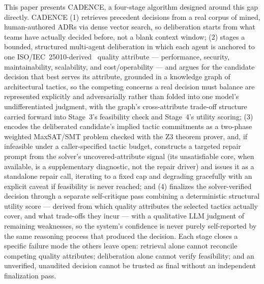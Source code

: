 \documentclass[lettersize,journal]{IEEEtran}
\begin{document}
This paper presents CADENCE, a four-stage algorithm designed around this gap directly. CADENCE (1) retrieves precedent decisions from a real corpus of mined, human-authored ADRs via dense vector search, so deliberation starts from what teams have actually decided before, not a blank context window; (2) stages a bounded, structured multi-agent deliberation in which each agent is anchored to one ISO/IEC~25010-derived~\cite{iso25010} quality attribute --- performance, security, maintainability, scalability, and cost/operability --- and argues for the candidate decision that best serves its attribute, grounded in a knowledge graph of architectural tactics, so the competing concerns a real decision must balance are represented explicitly and adversarially rather than folded into one model's undifferentiated judgment, with the graph's cross-attribute trade-off structure carried forward into Stage~3's feasibility check and Stage~4's utility scoring; (3) encodes the deliberated candidate's implied tactic commitments as a two-phase weighted MaxSAT/SMT problem checked with the Z3 theorem prover, and, if infeasible under a caller-specified tactic budget, constructs a targeted repair prompt from the solver's uncovered-attribute signal (its unsatisfiable core, when available, is a supplementary diagnostic, not the repair driver) and issues it as a standalone repair call, iterating to a fixed cap and degrading gracefully with an explicit caveat if feasibility is never reached; and (4) finalizes the solver-verified decision through a separate self-critique pass combining a deterministic structural utility score --- derived from which quality attributes the selected tactics actually cover, and what trade-offs they incur --- with a qualitative LLM judgment of remaining weaknesses, so the system's confidence is never purely self-reported by the same reasoning process that produced the decision. Each stage closes a specific failure mode the others leave open: retrieval alone cannot reconcile competing quality attributes; deliberation alone cannot verify feasibility; and an unverified, unaudited decision cannot be trusted as final without an independent finalization pass.
\end{document}
